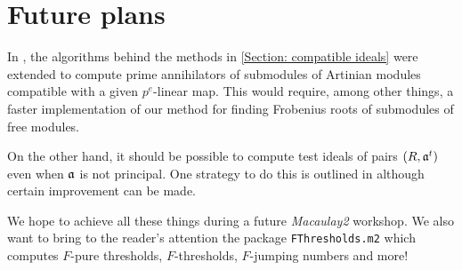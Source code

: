 \documentclass{amsart}
\begin{document}
\section{Future plans}

In \cite{KatzmanZhangAlgorithm}, the algorithms behind the methods in \autoref{Section: compatible ideals} were extended
to compute prime annihilators of submodules of Artinian modules compatible with a given $p^{e}$-linear map.
This would require, among other things, a faster implementation of our method for finding Frobenius roots of submodules of free modules.

On the other hand, it should be possible to compute test ideals of pairs $(R, \mathfrak{a}^t)$ even when $\mathfrak{a}$ is not principal.  One strategy to do this is outlined in \cite{SchwedeTuckerTestIdealsOfNonPrincipal} although certain improvement can be made.

We hope to achieve all these things during a future \emph{Macaulay2} workshop.  We also want to bring to the reader's attention the package \texttt{FThresholds.m2} which computes $F$-pure thresholds, $F$-thresholds, $F$-jumping numbers and more!



\end{document}
